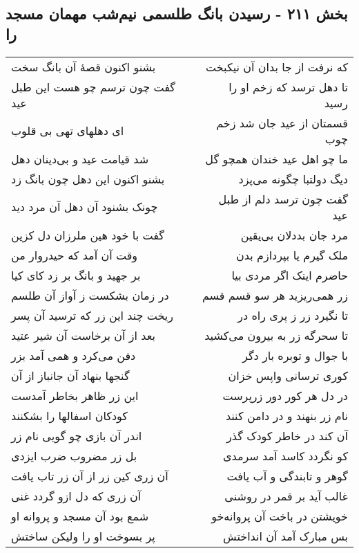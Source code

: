 \begin{center}
\section*{بخش ۲۱۱ - رسیدن بانگ طلسمی نیم‌شب مهمان مسجد را}
\label{sec:sh211}
\begin{longtable}{l p{0.5cm} r}
بشنو اکنون قصهٔ آن بانگ سخت
&&
که نرفت از جا بدان آن نیکبخت
\\
گفت چون ترسم چو هست این طبل عید
&&
تا دهل ترسد که زخم او را رسید
\\
ای دهلهای تهی بی قلوب
&&
قسمتان از عید جان شد زخم چوب
\\
شد قیامت عید و بی‌دینان دهل
&&
ما چو اهل عید خندان همچو گل
\\
بشنو اکنون این دهل چون بانگ زد
&&
دیگ دولتبا چگونه می‌پزد
\\
چونک بشنود آن دهل آن مرد دید
&&
گفت چون ترسد دلم از طبل عید
\\
گفت با خود هین ملرزان دل کزین
&&
مرد جان بددلان بی‌یقین
\\
وقت آن آمد که حیدروار من
&&
ملک گیرم یا بپردازم بدن
\\
بر جهید و بانگ بر زد کای کیا
&&
حاضرم اینک اگر مردی بیا
\\
در زمان بشکست ز آواز آن طلسم
&&
زر همی‌ریزید هر سو قسم قسم
\\
ریخت چند این زر که ترسید آن پسر
&&
تا نگیرد زر ز پری راه در
\\
بعد از آن برخاست آن شیر عتید
&&
تا سحرگه زر به بیرون می‌کشید
\\
دفن می‌کرد و همی آمد بزر
&&
با جوال و توبره بار دگر
\\
گنجها بنهاد آن جانباز از آن
&&
کوری ترسانی واپس خزان
\\
این زر ظاهر بخاطر آمدست
&&
در دل هر کور دور زرپرست
\\
کودکان اسفالها را بشکنند
&&
نام زر بنهند و در دامن کنند
\\
اندر آن بازی چو گویی نام زر
&&
آن کند در خاطر کودک گذر
\\
بل زر مضروب ضرب ایزدی
&&
کو نگردد کاسد آمد سرمدی
\\
آن زری کین زر از آن زر تاب یافت
&&
گوهر و تابندگی و آب یافت
\\
آن زری که دل ازو گردد غنی
&&
غالب آید بر قمر در روشنی
\\
شمع بود آن مسجد و پروانه او
&&
خویشتن در باخت آن پروانه‌خو
\\
پر بسوخت او را ولیکن ساختش
&&
بس مبارک آمد آن انداختش
\\

\end{longtable}
\end{center}
